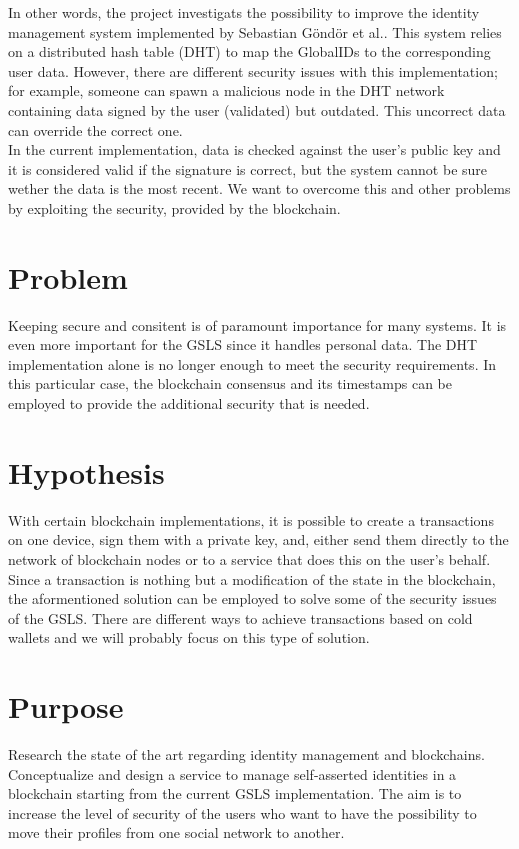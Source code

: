 \documentclass[paper=a4, fontsize=11pt]{scrartcl} %
\numberwithin{equation}{section} %
\numberwithin{figure}{section} %
\numberwithin{table}{section} %
\begin{document}
In other words, the project investigats the possibility to improve the identity management system implemented by Sebastian G{\"o}nd{\"o}r et al.\cite{gondor2016distributed}. This system relies on a distributed hash table (DHT) to map the GlobalIDs to the corresponding user data. However, there are different security issues with this implementation; for example, someone can spawn a malicious node in the DHT network containing data signed by the user (validated) but outdated. This uncorrect data can override the correct one. 
\\

In the current implementation, data is checked against the user’s public key and it is considered valid if the signature is correct, but the system cannot be sure wether the data is the most recent. We want to overcome this and other problems by exploiting the security, provided by the blockchain. 

\section{Problem}
Keeping secure and consitent is of paramount importance for many systems. It is even more important for the GSLS since it handles personal data.  The DHT implementation alone is no longer enough to meet the security requirements. In this particular case, the blockchain consensus and its timestamps can be employed to provide the additional security that is needed. 

\section{Hypothesis}
With certain blockchain implementations, it is possible to create a transactions \cite{wood2014ethereum} on one device, sign them with a private key, and, either send them directly to the network of blockchain nodes or to a service that does this on the user's behalf. \\

Since a transaction is nothing but a modification of the state in the blockchain, the aformentioned solution can be employed to solve some of the security issues of the GSLS. There are different ways to achieve transactions based on cold wallets \cite{icebox} \cite{light-wallet} and we will probably focus on this type of solution. 

\section{Purpose}
Research the state of the art regarding identity management and blockchains. Conceptualize and design a service to manage self-asserted identities in a blockchain starting from the current GSLS implementation. The aim is to increase the level of security of the users who want to have the possibility to move their profiles from one social network to another. 
\end{document}
